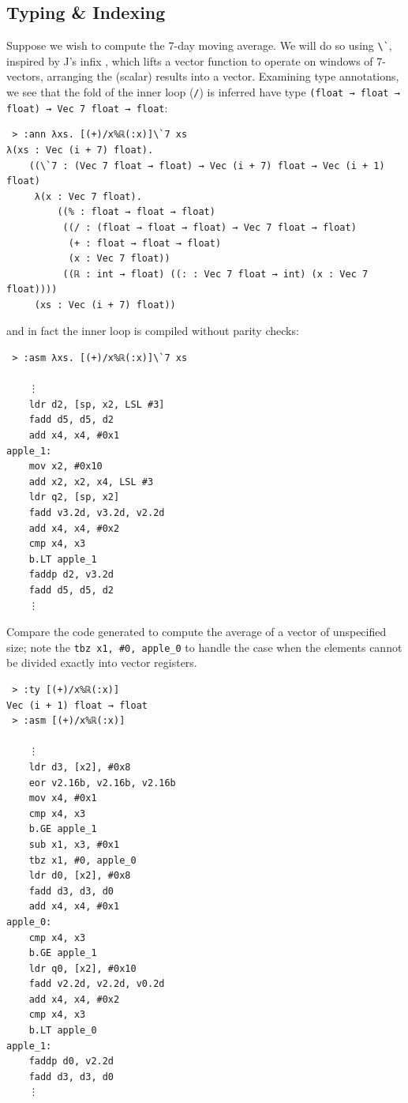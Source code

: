 \documentclass{article}
\begin{document}

\subsection{Typing \& Indexing}

Suppose we wish to compute the 7-day moving average. We will do so using \verb|\`|, inspired by J's infix \cite{nuvoc}, which lifts a vector function to operate on windows of 7-vectors, arranging the (scalar) results into a vector. Examining type annotations, we see that the fold of the inner loop (\verb|/|) is inferred have type \verb|(float → float → float) → Vec 7 float → float|:

\begin{verbatim}
 > :ann λxs. [(+)/x%ℝ(:x)]\`7 xs
λ(xs : Vec (i + 7) float).
    ((\`7 : (Vec 7 float → float) → Vec (i + 7) float → Vec (i + 1) float)
     λ(x : Vec 7 float).
         ((% : float → float → float)
          ((/ : (float → float → float) → Vec 7 float → float)
           (+ : float → float → float)
           (x : Vec 7 float))
          ((ℝ : int → float) ((: : Vec 7 float → int) (x : Vec 7 float))))
     (xs : Vec (i + 7) float))
\end{verbatim}

and in fact the inner loop is compiled without parity checks:

\begin{verbatim}
 > :asm λxs. [(+)/x%ℝ(:x)]\`7 xs

    ⋮
    ldr d2, [sp, x2, LSL #3]
    fadd d5, d5, d2
    add x4, x4, #0x1
apple_1:
    mov x2, #0x10
    add x2, x2, x4, LSL #3
    ldr q2, [sp, x2]
    fadd v3.2d, v3.2d, v2.2d
    add x4, x4, #0x2
    cmp x4, x3
    b.LT apple_1
    faddp d2, v3.2d
    fadd d5, d5, d2
    ⋮
\end{verbatim}

Compare the code generated to compute the average of a vector of unspecified size; note the \verb|tbz x1, #0, apple_0| to handle the case when the elements cannot be divided exactly into vector registers.

\begin{verbatim}
 > :ty [(+)/x%ℝ(:x)]
Vec (i + 1) float → float
 > :asm [(+)/x%ℝ(:x)]

    ⋮
    ldr d3, [x2], #0x8
    eor v2.16b, v2.16b, v2.16b
    mov x4, #0x1
    cmp x4, x3
    b.GE apple_1
    sub x1, x3, #0x1
    tbz x1, #0, apple_0
    ldr d0, [x2], #0x8
    fadd d3, d3, d0
    add x4, x4, #0x1
apple_0:
    cmp x4, x3
    b.GE apple_1
    ldr q0, [x2], #0x10
    fadd v2.2d, v2.2d, v0.2d
    add x4, x4, #0x2
    cmp x4, x3
    b.LT apple_0
apple_1:
    faddp d0, v2.2d
    fadd d3, d3, d0
    ⋮
\end{verbatim}
\end{document}
